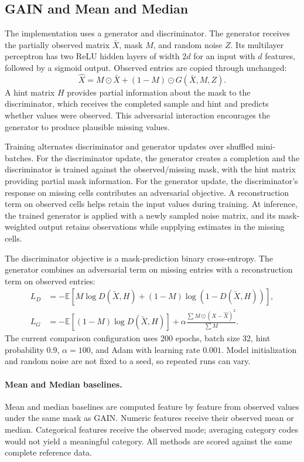 \documentclass[11pt]{article}
\begin{document}
\subsection{GAIN and Mean and Median}
The implementation uses a generator and discriminator. The generator receives the partially observed matrix $\bar{X}$, mask $M$, and random noise $Z$. Its multilayer perceptron has two ReLU hidden layers of width $2d$ for an input with $d$ features, followed by a sigmoid output. Observed entries are copied through unchanged:
\[
\hat{X}=M\odot\bar{X}+(1-M)\odot G(\bar{X},M,Z).
\]
A hint matrix $H$ provides partial information about the mask to the discriminator, which receives the completed sample and hint and predicts whether values were observed. This adversarial interaction encourages the generator to produce plausible missing values.

Training alternates discriminator and generator updates over shuffled mini-batches. For the discriminator update, the generator creates a completion and the discriminator is trained against the observed/missing mask, with the hint matrix providing partial mask information. For the generator update, the discriminator's response on missing cells contributes an adversarial objective. A reconstruction term on observed cells helps retain the input values during training. At inference, the trained generator is applied with a newly sampled noise matrix, and its mask-weighted output retains observations while supplying estimates in the missing cells.

The discriminator objective is a mask-prediction binary cross-entropy. The generator combines an adversarial term on missing entries with a reconstruction term on observed entries:
\begin{align*}
L_D &= -\mathbb{E}\left[M\log D(\tilde{X},H)+(1-M)\log(1-D(\tilde{X},H))\right],\\
L_G &= -\mathbb{E}\left[(1-M)\log D(\tilde{X},H)\right]
       +\alpha\frac{\sum M\odot(X-\hat{X})^2}{\sum M}.
\end{align*}
The current comparison configuration uses 200 epochs, batch size 32, hint probability 0.9, $\alpha=100$, and Adam with learning rate $0.001$. Model initialization and random noise are not fixed to a seed, so repeated runs can vary.

\paragraph{Mean and Median baselines.}
Mean and median baselines are computed feature by feature from observed values under the same mask as GAIN. Numeric features receive their observed mean or median. Categorical features receive the observed mode; averaging category codes would not yield a meaningful category. All methods are scored against the same complete reference data.
\end{document}
